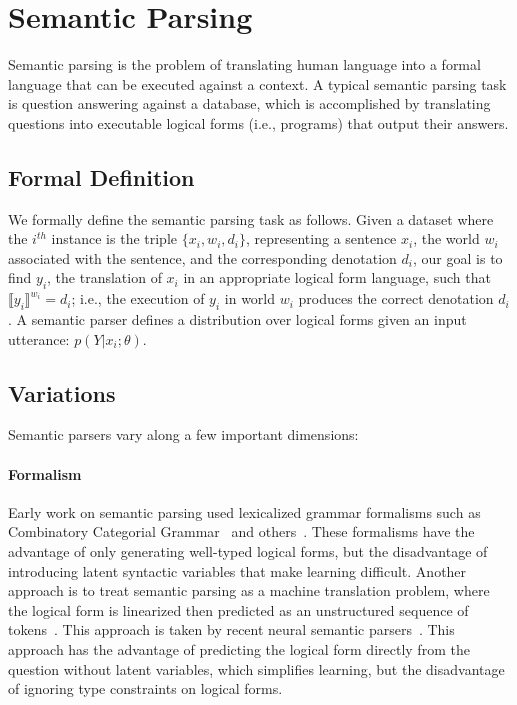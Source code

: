 \section{Semantic Parsing}
Semantic parsing is the problem of translating human language into a formal
language that can be executed against a context. A
typical semantic parsing task is question answering against a database, which
is accomplished by translating questions into executable logical forms (i.e.,
programs) that output their answers.

\subsection{Formal Definition}
We formally define the semantic parsing task as
follows. Given a dataset where the $i^{th}$ instance is the triple $\{x_i, w_i,
d_i\}$, representing a sentence $x_i$, the world $w_i$ associated with the
sentence, and the corresponding denotation $d_i$, our goal is to find $y_i$,
the translation of $x_i$ in an appropriate logical form language, such that
$\llbracket y_i\rrbracket^{w_i} = d_i$; i.e., the execution of $y_i$ in world $w_i$ produces
the correct denotation $d_i$.  A semantic parser defines a distribution over
logical forms given an input utterance: $p(Y|x_i; \theta)$.

\subsection{Variations}
Semantic parsers vary along a few important dimensions:
\paragraph{Formalism} Early work on semantic parsing used lexicalized grammar
formalisms such as Combinatory Categorial
Grammar~\cite{zettlemoyer05,zettlemoyer2007online,kwiatkowski2011lexical,kwiatkowski2013,krishnamurthy2012weakly,artzi2013}
and
others~\cite{liang2011learning,berant2013,zhao2015,wong2006learning,wong2007learning}.
These formalisms have the advantage of only generating well-typed logical
forms, but the disadvantage of introducing latent syntactic variables that make
learning difficult. Another approach is to treat semantic parsing as a machine
translation problem, where the logical form is linearized then predicted as an
unstructured sequence of tokens~\citep{andreas2013}.  This approach is taken by
recent neural semantic parsers~\citep{jia2016,dong2016,locascio2016,ling2016}.
This approach has the advantage of predicting the logical form directly from
the question without latent variables, which simplifies learning, but the
disadvantage of ignoring type constraints on logical forms.

